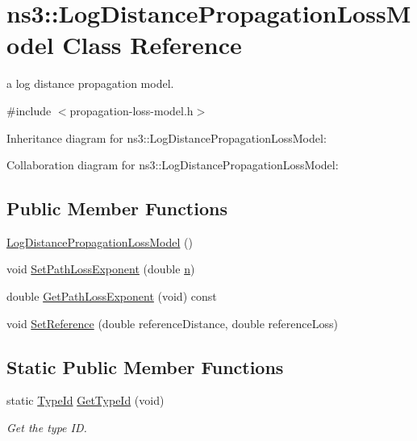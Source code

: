 \hypertarget{classns3_1_1LogDistancePropagationLossModel}{}\section{ns3\+:\+:Log\+Distance\+Propagation\+Loss\+Model Class Reference}
\label{classns3_1_1LogDistancePropagationLossModel}


a log distance propagation model.  




{\ttfamily \#include $<$propagation-\/loss-\/model.\+h$>$}



Inheritance diagram for ns3\+:\+:Log\+Distance\+Propagation\+Loss\+Model\+:


Collaboration diagram for ns3\+:\+:Log\+Distance\+Propagation\+Loss\+Model\+:
\subsection*{Public Member Functions}
\begin{DoxyCompactItemize}
\item 
\hyperlink{classns3_1_1LogDistancePropagationLossModel_a59b678e1444813c27be674f6ede5a2dc}{Log\+Distance\+Propagation\+Loss\+Model} ()
\item 
void \hyperlink{classns3_1_1LogDistancePropagationLossModel_af8d2797bafdf56b2e656d7183fb37169}{Set\+Path\+Loss\+Exponent} (double \hyperlink{lte__link__budget__x2__handover__measures_8m_abdb05bc5a064cf642a06c83b3392f148}{n})
\item 
double \hyperlink{classns3_1_1LogDistancePropagationLossModel_ae37b31efb718bc7d4737f54076ab8fe2}{Get\+Path\+Loss\+Exponent} (void) const 
\item 
void \hyperlink{classns3_1_1LogDistancePropagationLossModel_a4a5676c5b8a1a56b954ba7f50931acad}{Set\+Reference} (double reference\+Distance, double reference\+Loss)
\end{DoxyCompactItemize}
\subsection*{Static Public Member Functions}
\begin{DoxyCompactItemize}
\item 
static \hyperlink{classns3_1_1TypeId}{Type\+Id} \hyperlink{classns3_1_1LogDistancePropagationLossModel_acda2646fbab6f42502217c957367375c}{Get\+Type\+Id} (void)
\begin{DoxyCompactList}\small\item\em Get the type ID. \end{DoxyCompactList}\end{DoxyCompactItemize}
